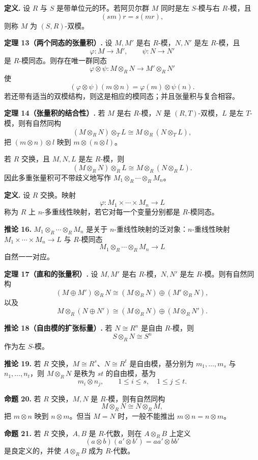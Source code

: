 \noindent\textbf{定义.} 设 $R$ 与 $S$ 是带单位元的环。若阿贝尔群 $M$ 同时是左 $S$-模与右 $R$-模，且
\[
(sm)r=s(mr),
\]
则称 $M$ 为 $(S,R)$-双模。


\noindent\textbf{定理 13（两个同态的张量积）.} 设 $M,M'$ 是右 $R$-模，$N,N'$ 是左 $R$-模，且
\[
\varphi:M\to M',
\qquad
\psi:N\to N'
\]
是 $R$-模同态。则存在唯一群同态
\[
\varphi\otimes\psi:M\otimes_R N\longrightarrow M'\otimes_R N'
\]
使
\[
(\varphi\otimes\psi)(m\otimes n)=\varphi(m)\otimes\psi(n).
\]
若还带有适当的双模结构，则这是相应的模同态；并且张量积与复合相容。


\noindent\textbf{定理 14（张量积的结合性）.} 若 $M$ 是右 $R$-模，$N$ 是 $(R,T)$-双模，$L$ 是左 $T$-模，则有自然同构
\[
(M\otimes_R N)\otimes_T L
\cong
M\otimes_R (N\otimes_T L),
\]
把 $(m\otimes n)\otimes l$ 映到 $m\otimes(n\otimes l)$。

若 $R$ 交换，且 $M,N,L$ 是左 $R$-模，则
\[
(M\otimes_R N)\otimes_R L\cong M\otimes_R(N\otimes_R L).
\]
因此多重张量积可不带歧义地写作 $M_1\otimes_R\cdots\otimes_R M_n$。


\noindent\textbf{定义.} 设 $R$ 交换。映射
\[
\varphi:M_1\times\cdots\times M_n\longrightarrow L
\]
称为 $R$ 上 $n$-多重线性映射，若它对每一个变量分别都是 $R$-模同态。


\noindent\textbf{推论 16.} $M_1\otimes_R\cdots\otimes_R M_n$ 是关于 $n$-重线性映射的泛对象：$n$-重线性映射 $M_1\times\cdots\times M_n\to L$ 与 $R$-模同态
\[
M_1\otimes_R\cdots\otimes_R M_n\to L
\]
自然一一对应。


\noindent\textbf{定理 17（直和的张量积）.} 设 $M,M'$ 是右 $R$-模，$N,N'$ 是左 $R$-模。则有自然同构
\[
(M\oplus M')\otimes_R N
\cong
(M\otimes_R N)\oplus(M'\otimes_R N),
\]
以及
\[
M\otimes_R(N\oplus N')
\cong
(M\otimes_R N)\oplus(M\otimes_R N').
\]


\noindent\textbf{推论 18（自由模的扩张标量）.} 若 $N\cong R^n$ 是自由 $R$-模，则
\[
S\otimes_R N\cong S^n
\]
作为左 $S$-模。


\noindent\textbf{推论 19.} 若 $R$ 交换，$M\cong R^s$、$N\cong R^t$ 是自由模，基分别为 $m_1,
\ldots,m_s$ 与 $n_1,
\ldots,n_t$，则 $M\otimes_R N$ 是秩为 $st$ 的自由模，基为
\[
m_i\otimes n_j,
\qquad 1\leq i\leq s,
\quad 1\leq j\leq t.
\]


\noindent\textbf{命题 20.} 若 $R$ 交换，$M,N$ 是 $R$-模，则有自然同构
\[
M\otimes_R N\cong N\otimes_R M,
\]
把 $m\otimes n$ 映到 $n\otimes m$。但当 $M=N$ 时，一般不能推出 $m\otimes n=n\otimes m$。


\noindent\textbf{命题 21.} 若 $R$ 交换，$A,B$ 是 $R$-代数，则在 $A\otimes_R B$ 上定义
\[
(a\otimes b)(a'\otimes b')=aa'\otimes bb'
\]
是良定义的，并使 $A\otimes_R B$ 成为 $R$-代数。


